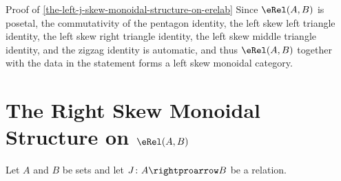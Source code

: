 \begin{Proof}{Proof of \cref{the-left-j-skew-monoidal-structure-on-erelab}}%
    Since $\eRel(A,B)$ is posetal, the commutativity of the pentagon identity, the left skew left triangle identity, the left skew right triangle identity, the left skew middle triangle identity, and the zigzag identity is automatic, and thus $\eRel(A,B)$ together with the data in the statement forms a left skew monoidal category.
\end{Proof}
\section{The Right Skew Monoidal Structure on \texorpdfstring{$\eRel(A,B)$}{Rel(A,B)}}\label{section-the-right-skew-monoidal-structure-on-rel-a-b}
Let $A$ and $B$ be sets and let $J\colon A\rightproarrow B$ be a relation.
